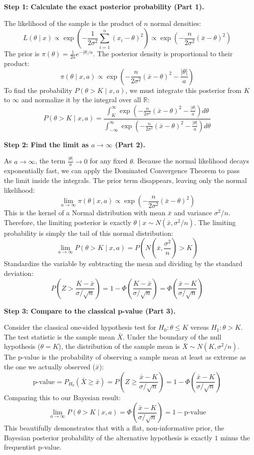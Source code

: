 \begin{solution}
\textbf{Step 1: Calculate the exact posterior probability (Part 1).}

The likelihood of the sample is the product of $n$ normal densities:
\[ L(\theta \mid x) \propto \exp\left( -\frac{1}{2\sigma^2} \sum_{i=1}^n (x_i - \theta)^2 \right) \propto \exp\left( -\frac{n}{2\sigma^2} (\bar{x} - \theta)^2 \right) \]
The prior is $\pi(\theta) = \frac{1}{2a} e^{-|\theta|/a}$.
The posterior density is proportional to their product:
\[ \pi(\theta \mid x, a) \propto \exp\left( -\frac{n}{2\sigma^2} (\bar{x} - \theta)^2 - \frac{|\theta|}{a} \right) \]
To find the probability $P(\theta > K \mid x, a)$, we must integrate this posterior from $K$ to $\infty$ and normalize it by the integral over all $\mathbb{R}$:
\[ P(\theta > K \mid x, a) = \frac{\int_K^\infty \exp\left( -\frac{n}{2\sigma^2} (\bar{x} - \theta)^2 - \frac{|\theta|}{a} \right) d\theta}{\int_{-\infty}^\infty \exp\left( -\frac{n}{2\sigma^2} (\bar{x} - \theta)^2 - \frac{|\theta|}{a} \right) d\theta} \]

\textbf{Step 2: Find the limit as $a \to \infty$ (Part 2).}

As $a \to \infty$, the term $\frac{|\theta|}{a} \to 0$ for any fixed $\theta$.
Because the normal likelihood decays exponentially fast, we can apply the Dominated Convergence Theorem to pass the limit inside the integrals.
The prior term disappears, leaving only the normal likelihood:
\[ \lim_{a \to \infty} \pi(\theta \mid x, a) \propto \exp\left( -\frac{n}{2\sigma^2} (\bar{x} - \theta)^2 \right) \]
This is the kernel of a Normal distribution with mean $\bar{x}$ and variance $\sigma^2/n$.
Therefore, the limiting posterior is exactly $\theta \mid x \sim N(\bar{x}, \sigma^2/n)$.
The limiting probability is simply the tail of this normal distribution:
\[ \lim_{a \to \infty} P(\theta > K \mid x, a) = P\left( N\left(\bar{x}, \frac{\sigma^2}{n}\right) > K \right) \]
Standardize the variable by subtracting the mean and dividing by the standard deviation:
\[ P\left( Z > \frac{K - \bar{x}}{\sigma/\sqrt{n}} \right) = 1 - \Phi\left( \frac{K - \bar{x}}{\sigma/\sqrt{n}} \right) = \Phi\left( \frac{\bar{x} - K}{\sigma/\sqrt{n}} \right) \]

\textbf{Step 3: Compare to the classical p-value (Part 3).}

Consider the classical one-sided hypothesis test for $H_0: \theta \leq K$ versus $H_1: \theta > K$.
The test statistic is the sample mean $\bar{X}$. Under the boundary of the null hypothesis ($\theta = K$), the distribution of the sample mean is $\bar{X} \sim N(K, \sigma^2/n)$.
The p-value is the probability of observing a sample mean at least as extreme as the one we actually observed ($\bar{x}$):
\[ \text{p-value} = P_{H_0}(\bar{X} \geq \bar{x}) = P\left( Z \geq \frac{\bar{x} - K}{\sigma/\sqrt{n}} \right) = 1 - \Phi\left( \frac{\bar{x} - K}{\sigma/\sqrt{n}} \right) \]
Comparing this to our Bayesian result:
\[ \lim_{a \to \infty} P(\theta > K \mid x, a) = \Phi\left( \frac{\bar{x} - K}{\sigma/\sqrt{n}} \right) = 1 - \text{p-value} \]
This beautifully demonstrates that with a flat, non-informative prior, the Bayesian posterior probability of the alternative hypothesis is exactly $1$ minus the frequentist p-value.
\end{solution}

